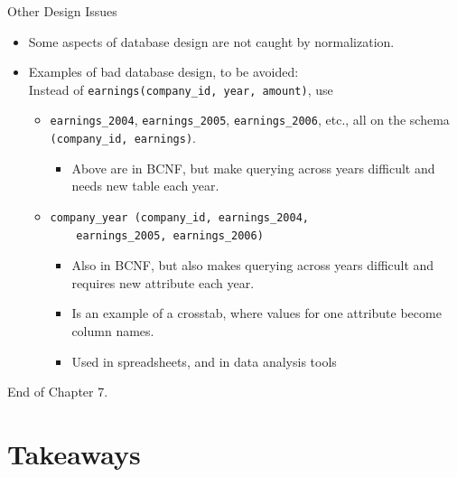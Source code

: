 \documentclass{beamer}
\begin{document}
\begin{frame}[fragile]{Other Design Issues}
    \begin{itemize}
        \item Some aspects of database design are not caught by normalization.
        \item Examples of bad database design, to be avoided:\\
            Instead of \verb|earnings(company_id, year, amount)|, use
            \begin{itemize}
                \item \verb|earnings_2004|, \verb|earnings_2005|, \verb|earnings_2006|, etc., all on the schema \verb|(company_id, earnings)|.
                    \begin{itemize}
                        \item Above are in BCNF, but make querying across years difficult and needs new table each year.
                    \end{itemize}
                \item
                    \begin{verbatim}
company_year (company_id, earnings_2004,
    earnings_2005, earnings_2006)
                    \end{verbatim}
                    \vspace{-3mm}

                    \begin{itemize}
                        \item Also in BCNF, but also makes querying across years difficult and requires new attribute each year.
                        \item Is an example of a crosstab, where values for one attribute become column names.
                        \item Used in spreadsheets, and in data analysis tools
                    \end{itemize}
            \end{itemize}
    \end{itemize}
\end{frame}

\begin{frame}{}
     \centering
     \Huge End of Chapter 7.
\end{frame}

\section*{Takeaways}
\end{document}
